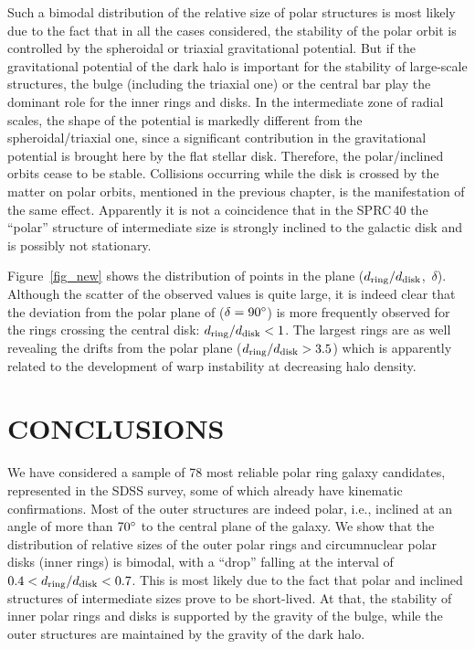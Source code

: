 \documentclass{ab}
\def\degr{\hbox{$^\circ$}}
\begin{document}
Such a bimodal distribution of the relative size of polar
structures is most likely due to the fact that in all the cases
considered, the stability of the polar orbit is controlled by the
spheroidal or triaxial gravitational potential. But if the
gravitational potential of the dark halo is important for the
stability of large-scale structures, the bulge (including the
triaxial one) or the central bar play the dominant role for the
inner rings and disks. In the intermediate zone of radial scales,
the shape of the potential  is markedly different from the
spheroidal/triaxial one, since a significant contribution in the
gravitational potential is brought here by the flat stellar disk.
Therefore, the polar/inclined orbits cease to be stable.
Collisions occurring while the disk is crossed by the matter on
polar orbits, mentioned in the previous chapter, is the
manifestation of the same effect. Apparently it is not a
coincidence that in the SPRC\,40 the ``polar'' structure of
intermediate size is strongly inclined to the galactic disk and is
possibly not stationary.



Figure~\ref{fig_new} shows the distribution of points
in the plane   \mbox{($d_{\rm ring}/d_{\rm disk}$, $\delta$).}
Although the scatter of the observed values is quite large, it is
indeed clear that the deviation from the polar plane of
($\delta=90\degr$) is more frequently observed for the rings
crossing the central disk: \mbox{$d_{\rm ring}/d_{\rm disk}<1$.}
The largest rings are as well revealing the drifts from the polar
plane \mbox{($d_{\rm ring}/d_{\rm disk}>3.5$)} which is apparently
related to the development of warp instability at decreasing halo
density.





\section{CONCLUSIONS }
\label{sec_conclusion}

We have considered a sample of 78 most reliable polar ring galaxy
candidates, represented in the SDSS survey, some of which already
have kinematic confirmations. Most of the outer structures are
indeed polar, i.e., inclined at an angle of more than $70\degr$ to
the central plane of the galaxy. We show that the distribution of
relative sizes of the outer polar rings and circumnuclear polar
disks (inner rings) is bimodal, with a ``drop'' falling at the
interval of \mbox{$0.4< d_{\rm ring}/d_{\rm disk} < 0.7$}. This is
most likely due to the fact that polar and inclined structures of
intermediate sizes prove to be short-lived. At that, the stability
of inner polar rings and disks is supported by the gravity of the
bulge, while the outer structures are maintained by the gravity of
the dark halo.
\end{document}
